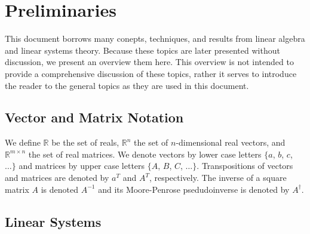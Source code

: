 \chapter{Preliminaries}
This document borrows many conepts, techniques, and results from linear algebra and linear systems theory. Because these topics are later presented without discussion, we present an overview them here. This overview is not intended to provide a comprehensive discussion of these topics, rather it serves to introduce the reader to the general topics as they are used in this document.

\section{Vector and Matrix Notation}
We define $\mathbb{R}$ be the set of reals, $\mathbb{R}^n$ the set of $n$-dimensional real vectors, and $\mathbb{R}^{m\times n}$ the set of real matrices. We denote vectors by lower case letters $\{a$, $b$, $c$, $\dots\}$ and matrices by upper case letters $\{A$, $B$, $C$, $\dots\}$. Transpositions of vectors and matrices are denoted by $a^T$ and $A^T$, respectively. The inverse of a square matrix $A$ is denoted $A^{-1}$ and its Moore-Penrose psedudoinverse is denoted by $A^\dagger$.

\section{Linear Systems}
